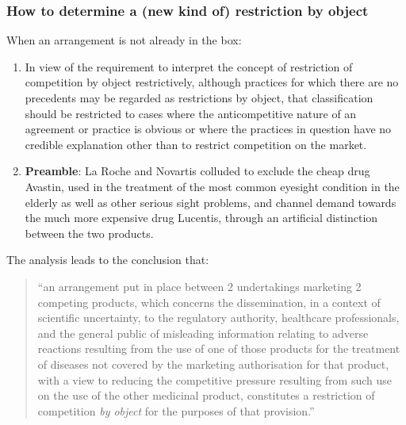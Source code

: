             
        

        \subsubsection{How to determine a (new kind of) restriction by object}

            When an arrangement is not already in the box:

            \begin{enumerate}[label=\alph*.]
                \item In view of the requirement to interpret the concept of restriction of competition by object restrictively, although practices for which there are no precedents may be regarded as restrictions by object, that classification should be restricted to cases where the anticompetitive nature of an agreement or practice is obvious or where the practices in question have no credible explanation other than to restrict competition on the market.
                \item \textbf{Preamble}: La Roche and Novartis colluded to exclude the cheap drug Avastin, used in the treatment of the most common eyesight condition in the elderly as well as other serious sight problems, and channel demand towards the much more expensive drug Lucentis, through an artificial distinction between the two products.
            \end{enumerate}

            The analysis leads to the conclusion that:
            \begin{quote}
                “an arrangement put in place between 2 undertakings marketing 2 competing products, which concerns the dissemination, in a context of scientific uncertainty, to the regulatory authority, healthcare professionals, and the general public of misleading information relating to adverse reactions resulting from the use of one of those products for the treatment of diseases not covered by the marketing authorisation for that product, with a view to reducing the competitive pressure resulting from such use on the use of the other medicinal product, constitutes a restriction of competition \textit{by object} for the purposes of that provision.”
            \end{quote}

